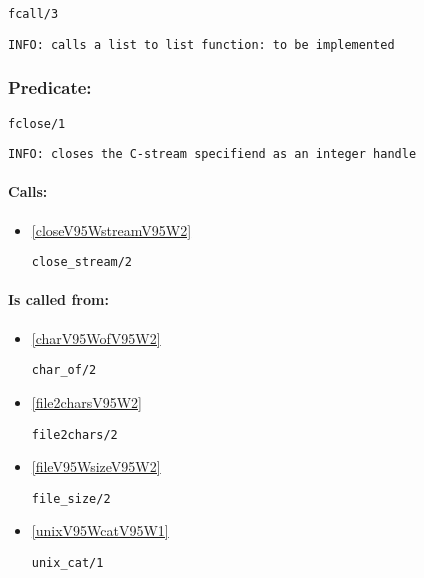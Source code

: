 \begin{verbatim}
fcall/3
\end{verbatim}

{\small \begin{verbatim}
INFO: calls a list to list function: to be implemented

\end{verbatim}}

\subsubsection{Predicate:} \label{fcloseV95W1}

\begin{verbatim}
fclose/1
\end{verbatim}

{\small \begin{verbatim}
INFO: closes the C-stream specifiend as an integer handle

\end{verbatim}}
\paragraph{Calls:} 
\begin{itemize}
\item \ref{closeV95WstreamV95W2} 
\begin{verbatim}
close_stream/2
\end{verbatim}

\end{itemize}
\paragraph{Is called from:} 
\begin{itemize}
\item \ref{charV95WofV95W2} 
\begin{verbatim}
char_of/2
\end{verbatim}

\item \ref{file2charsV95W2} 
\begin{verbatim}
file2chars/2
\end{verbatim}

\item \ref{fileV95WsizeV95W2} 
\begin{verbatim}
file_size/2
\end{verbatim}

\item \ref{unixV95WcatV95W1} 
\begin{verbatim}
unix_cat/1
\end{verbatim}

\end{itemize}

